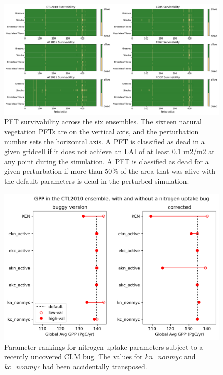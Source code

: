 \documentclass[11pt]{article}
\begin{document}
\begin{landscape}
\begin{figure}[h]
\centering
\includegraphics[width=50pc]{../figs/supp/survivability.png}
\caption{PFT survivability across the six ensembles. The sixteen natural vegetation PFTs are on the vertical axis, and the perturbation number sets the horizontal axis. A PFT is classified as dead in a given gridcell if it does not achieve an LAI of at least 0.1 m2/m2 at any point during the simulation. A PFT is classified as dead for a given perturbation if more than 50\% of the area that was alive with the default parameters is dead in the perturbed simulation.}
\label{supp:surv}
\end{figure}
\end{landscape}

\begin{figure}[h]
\centering
\includegraphics[width=\textwidth]{../figs/supp/funbug.png}
\caption{Parameter rankings for nitrogen uptake parameters subject to a recently uncovered CLM bug. The values for \textit{kn\_nonmyc} and \textit{kc\_nonmyc} had been accidentally transposed.}
\label{supp:funbug}
\end{figure}
\end{document}
